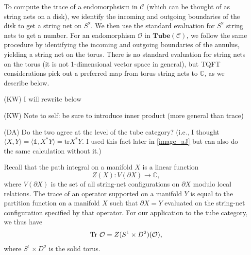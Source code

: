 \documentclass[12pt,a4paper]{article}
\newcounter{arrow}
\newcommand{\ra}{\rightarrow}
\newcommand{\unit}{\mathds{1}}
\newcommand{\cc}{\mathbb{C}}
\newcommand{\mcc}{\mathcal{C}}
\newcommand{\mco}{\mathcal{O}}
\newcommand\be            {\begin{equation}}
\newcommand\ee            {\end{equation}}
\newcommand{\p}{\partial}
\newcommand{\tube}{\textbf{Tube}}
\newcommand{\kw}[1]{{\color{kwcolor}\footnotesize{(KW) #1}}}
\newcommand{\dave}[1]{{\color{ao(english)}\footnotesize{(DA) #1}}}
\begin{document}
To compute the trace of a endomorphsism in $\mcc$ (which can be thought of
as string nets on a disk), we identify the incoming and outgoing
boundaries of the disk to get a string net on $S^2$.
We then use the standard evaluation for $S^2$ string nets to get a number.
For an endomorphism $\mco$ in $\tube(\mcc)$, we follow the same procedure by identifying the incoming and outgoing
boundaries of the annulus, yielding a string net on the torus.
There is no standard evaluation for string nets on the torus (it is not 1-dimensional vector space in general),
but TQFT considerations pick out a preferred map from torus string nets to $\cc$, as we describe below.


\kw{I will rewrite below}

\kw{Note to self: be sure to introduce inner product (more general than trace)}

\dave{Do the two agree at the level of the tube category?
(i.e., I thought $\langle X, Y \rangle  = \langle \unit ,X^*Y\rangle = \text{tr} X^*Y$.
I used this fact later in \ref{image_aJ} but can also do the same calculation without it.)}

Recall that the path integral on a manifold $X$ is a linear function
\be Z(X) : V(\p X) \ra \cc,\ee
where $V(\p X)$ is the set of all string-net configurations on $\p X$ modulo local relations.
The trace of an operator supported on a manifold $Y$ is equal to the partition function on a manifold $X$ 
such that $\p X = Y$ evaluated on the string-net configuration specified by that operator. 
For our application to the tube category, we thus have 
\be {\rm Tr}\ \mco = Z(S^1 \times D^2)(\mco),\ee
where $S^1\times D^2$ is the solid torus. 
\end{document}
